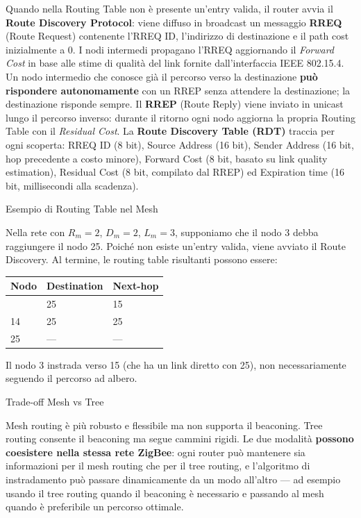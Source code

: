 \documentclass[
  italian,
  openany]{book}
\newcounter{none} %
\begin{document}
Quando nella Routing Table non è presente un'entry valida, il router
avvia il \textbf{Route Discovery Protocol}: viene diffuso in broadcast
un messaggio \textbf{RREQ} (Route Request) contenente l'RREQ ID,
l'indirizzo di destinazione e il path cost inizialmente a 0. I nodi
intermedi propagano l'RREQ aggiornando il \emph{Forward Cost} in base
alle stime di qualità del link fornite dall'interfaccia IEEE 802.15.4.
Un nodo intermedio che conosce già il percorso verso la destinazione
\textbf{può rispondere autonomamente} con un RREP senza attendere la
destinazione; la destinazione risponde sempre. Il \textbf{RREP} (Route
Reply) viene inviato in unicast lungo il percorso inverso: durante il
ritorno ogni nodo aggiorna la propria Routing Table con il
\emph{Residual Cost}. La \textbf{Route Discovery Table (RDT)} traccia
per ogni scoperta: RREQ ID (8 bit), Source Address (16 bit), Sender
Address (16 bit, hop precedente a costo minore), Forward Cost (8 bit,
basato su link quality estimation), Residual Cost (8 bit, compilato dal
RREP) ed Expiration time (16 bit, millisecondi alla scadenza).

\begin{callouttip}{Esempio di Routing Table nel Mesh}

Nella rete con \(R_m=2\), \(D_m=2\), \(L_m=3\), supponiamo che il nodo 3
debba raggiungere il nodo 25. Poiché non esiste un'entry valida, viene
avviato il Route Discovery. Al termine, le routing table risultanti
possono essere:

{\def\LTcaptype{none} %
\begin{longtable}[]{@{}lll@{}}
\toprule\noalign{}
Nodo & Destination & Next-hop \\
\midrule\noalign{}
\endhead
\bottomrule\noalign{}
\endlastfoot
3 & 25 & 15 \\
14 & 25 & 25 \\
25 & --- & --- \\
\end{longtable}
}

Il nodo 3 instrada verso 15 (che ha un link diretto con 25), non
necessariamente seguendo il percorso ad albero.

\end{callouttip}

\begin{callouttip}{Trade-off Mesh vs Tree}

Mesh routing è più robusto e flessibile ma non supporta il beaconing.
Tree routing consente il beaconing ma segue cammini rigidi. Le due
modalità \textbf{possono coesistere nella stessa rete ZigBee}: ogni
router può mantenere sia informazioni per il mesh routing che per il
tree routing, e l'algoritmo di instradamento può passare dinamicamente
da un modo all'altro --- ad esempio usando il tree routing quando il
beaconing è necessario e passando al mesh quando è preferibile un
percorso ottimale.

\end{callouttip}
\end{document}
